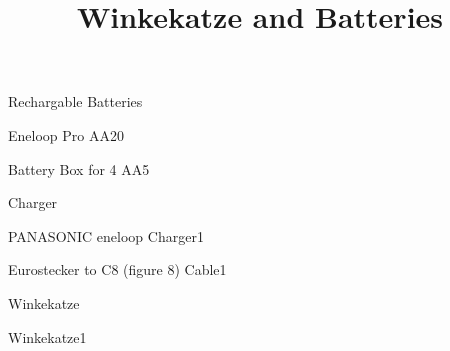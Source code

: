\def\papersize{5}




\title{Winkekatze and Batteries}

\begin{checklist}{Rechargable Batteries}
  \item{Eneloop Pro AA}{20}
  \item{Battery Box for 4 AA}{5}
\end{checklist}

\begin{checklist}{Charger}
  \item{PANASONIC eneloop Charger}{1}
  \item{Eurostecker to C8 (figure 8) Cable}{1}
\end{checklist}

\begin{checklist}{Winkekatze}
  \item{Winkekatze}{1}
\end{checklist}


